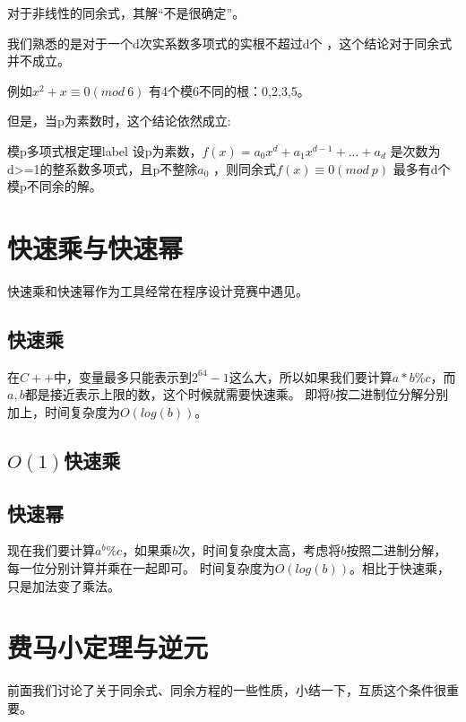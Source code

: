 

\vbox{}

对于非线性的同余式，其解“不是很确定”。

我们熟悉的是对于{\heiti 一个d次实系数多项式的实根不超过d个} ，这个结论对于同余式并不成立。

例如$x^2+x\equiv 0(mod\ 6)$ 有4个模6不同的根：0,2,3,5。

但是，{\heiti 当p为素数时，这个结论依然成立:}

\begin{theorem}{模p多项式根定理}{label}
设p为素数，$f(x)=a_0x^d+a_1x^{d-1}+...+a_d$ 是次数为d>=1的整系数多项式，且p不整除$a_0$ ，则同余式$f(x)\equiv 0(mod\ p)$ 最多有d个模p不同余的解。
\end{theorem}

\section{快速乘与快速幂}
快速乘和快速幂作为工具经常在程序设计竞赛中遇见。
\subsection{快速乘}
在$C++$中，变量最多只能表示到$2^{64}-1$这么大，所以如果我们要计算$a*b\%c$，而$a,b$都是接近表示上限的数，这个时候就需要快速乘。
即将$b$按二进制位分解分别加上，时间复杂度为$O(log(b))$。


\subsection{$O(1)$快速乘}



\subsection{快速幂}
现在我们要计算$a^b\%c$，如果乘$b$次，时间复杂度太高，考虑将$b$按照二进制分解，每一位分别计算并乘在一起即可。
时间复杂度为$O(log(b))$。相比于快速乘，只是加法变了乘法。



\section{费马小定理与逆元}
前面我们讨论了关于同余式、同余方程的一些性质，小结一下，互质这个条件很重要。

